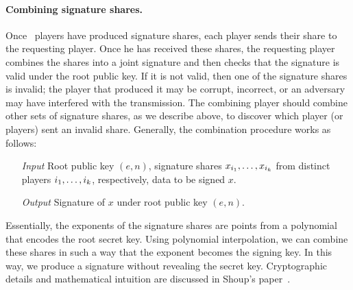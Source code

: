 \paragraph{Combining signature shares.}
Once \nums\ players have produced signature shares, each player sends
their share to the requesting player. Once he has received these
shares, the requesting player combines the shares into a joint
signature and then checks that the signature is valid under the root
public key. If it is not valid, then one of the signature shares is
invalid; the player that produced it may be corrupt, incorrect, or an adversary may have interfered with the transmission.
The combining player should combine other sets of signature shares, as we describe above, to discover
which player (or players) sent an invalid share. Generally, the
combination procedure works as follows:
\begin{itemize}
\item[{\it Input}] Root public key $(e,n)$, signature
shares $x_{i_1},\dots,x_{i_{k}}$ from distinct players
$i_1,\dots,i_{k}$, respectively, data to be signed $x$.

\item[{\it Output}] Signature of $x$ under root public key $(e,n)$.
\end{itemize}
Essentially, the exponents of the signature shares are points from a
polynomial that encodes the root secret key. Using polynomial
interpolation, we can combine these shares in such a way that the
exponent becomes the signing key. In this way, we produce a signature
without revealing the secret key. Cryptographic details and
mathematical intuition are discussed in Shoup's
paper~\cite{shoup-sig}.

